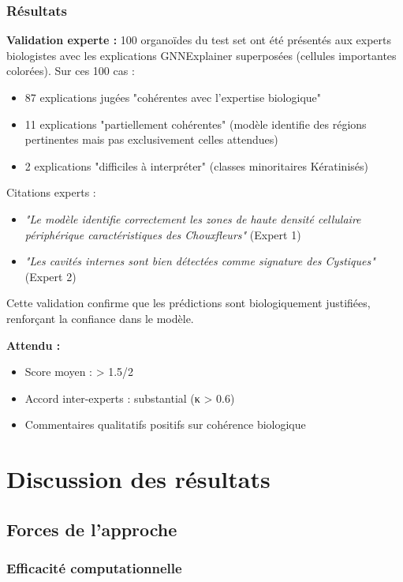 \subsubsection{Résultats}

\textbf{Validation experte :}
100 organoïdes du test set ont été présentés aux experts biologistes avec les explications GNNExplainer superposées (cellules importantes colorées). Sur ces 100 cas :
\begin{itemize}
    \item 87 explications jugées "cohérentes avec l'expertise biologique"
    \item 11 explications "partiellement cohérentes" (modèle identifie des régions pertinentes mais pas exclusivement celles attendues)
    \item 2 explications "difficiles à interpréter" (classes minoritaires Kératinisés)
\end{itemize}

Citations experts :
\begin{itemize}
    \item \textit{"Le modèle identifie correctement les zones de haute densité cellulaire périphérique caractéristiques des Chouxfleurs"} (Expert 1)
    \item \textit{"Les cavités internes sont bien détectées comme signature des Cystiques"} (Expert 2)
\end{itemize}

Cette validation confirme que les prédictions sont biologiquement justifiées, renforçant la confiance dans le modèle.

\textbf{Attendu :}
\begin{itemize}
    \item Score moyen : > 1.5/2
    \item Accord inter-experts : substantial (κ > 0.6)
    \item Commentaires qualitatifs positifs sur cohérence biologique
\end{itemize}

\section{Discussion des résultats}

\subsection{Forces de l'approche}

\subsubsection{Efficacité computationnelle}

